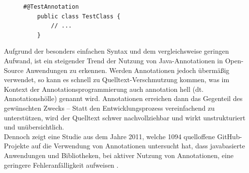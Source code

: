 \begin{figure}[H]
	\centering
	\begin{lstlisting}[caption={Beispiel einer annotierten Klasse.}, captionpos=b, label=lst:annotated_example]
	#@TestAnnotation
	public class TestClass {
	    // ...
	}
	\end{lstlisting}
\end{figure}
\noindent Aufgrund der besonders einfachen Syntax und dem vergleichsweise geringen Aufwand, ist ein steigender Trend der Nutzung von Java-Annotationen in Open-Source Anwendungen zu erkennen. Werden Annotationen jedoch übermäßig verwendet, so kann es schnell zu Quelltext-Verschmutzung kommen, was im Kontext der Annotationsprogrammierung auch \glqq annotation hell\grqq{} (dt. Annotationshölle) genannt wird. Annotationen erreichen dann das Gegenteil des gewünschten Zwecks -- Statt den Entwicklungsprozess vereinfachend zu unterstützen, wird der Quelltext schwer nachvollziehbar und wirkt unstrukturiert und unübersichtlich.\\
Dennoch zeigt eine Studie aus dem Jahre 2011, welche 1094 quelloffene GitHub-Projekte auf die Verwendung von Annotationen untersucht hat, dass javabasierte Anwendungen und Bibliotheken, bei aktiver Nutzung von Annotationen, eine geringere Fehleranfälligkeit aufweisen \cite{Rocha2011}.
